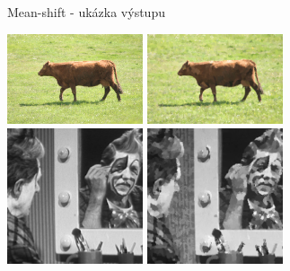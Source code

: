 \documentclass{beamer}
\begin{document}
\begin{frame}{Mean-shift - ukázka výstupu}
  \begin{center}
    \includegraphics[width=4cm,keepaspectratio]{images/img.pdf}
    \quad
    \includegraphics[width=4cm,keepaspectratio]{images/ms.pdf}\\ \medskip
    \includegraphics[width=4cm,keepaspectratio]{images/sobel.pdf}
    \quad
    \includegraphics[width=4cm,keepaspectratio]{images/sobel_ms.pdf}
  \end{center}
\end{frame}
\end{document}
